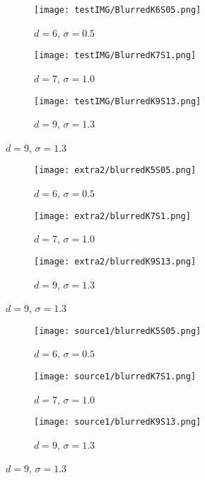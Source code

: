 \documentclass{article}
\begin{document}
\newpage

\begin{figure}[h]
    \begin{subfigure}{0.25\textwidth}
    \texttt{[image: testIMG/BlurredK6S05.png]}
    \caption{$d=6$, $\sigma=0.5$}
    \label{fig:first}
\end{subfigure}%
    \hfill
\begin{subfigure}{0.25\textwidth}
    \texttt{[image: testIMG/BlurredK7S1.png]}
    \caption{$d=7$, $\sigma=1.0$}
    \label{fig:second}
\end{subfigure}%
    \hfill
\begin{subfigure}{0.25\textwidth}
    \texttt{[image: testIMG/BlurredK9S13.png]}
    \caption{$d=9$, $\sigma=1.3$}
    \label{fig:third}
\end{subfigure}
    \hfill
\label{fig:figures} 
\end{figure}

\begin{figure}[h]
\begin{subfigure}{0.3\textwidth}
    \texttt{[image: extra2/blurredK5S05.png]}
    \caption{$d=6$, $\sigma=0.5$}
    \label{fig:first}
\end{subfigure}%
    \hfill
\begin{subfigure}{0.3\textwidth}
    \texttt{[image: extra2/blurredK7S1.png]}
    \caption{$d=7$, $\sigma=1.0$}
    \label{fig:second}
\end{subfigure}%
\hfill
\begin{subfigure}{0.3\textwidth}
    \texttt{[image: extra2/blurredK9S13.png]}
    \caption{$d=9$, $\sigma=1.3$}
    \label{fig:third}
\end{subfigure}
\label{fig:figures}
\end{figure}

\begin{figure}[h]
\begin{subfigure}{0.25\textwidth}
    \texttt{[image: source1/blurredK5S05.png]}
    \caption{$d=6$, $\sigma=0.5$}
    \label{fig:first}
\end{subfigure}%
    \hfill
\begin{subfigure}{0.25\textwidth}
    \texttt{[image: source1/blurredK7S1.png]}
    \caption{$d=7$, $\sigma=1.0$}
    \label{fig:second}
\end{subfigure}%
\hfill
\begin{subfigure}{0.25\textwidth}
    \texttt{[image: source1/blurredK9S13.png]}
    \caption{$d=9$, $\sigma=1.3$}
    \label{fig:third}
\end{subfigure}
\label{fig:figures}
\end{figure}
\newpage
\end{document}
